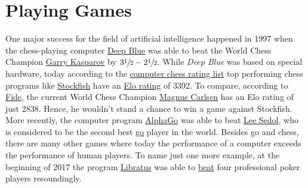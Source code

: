 \chapter{Playing Games}
One major success for the field of artificial intelligence happened in 1997 when the chess-playing computer
\href{https://en.wikipedia.org/wiki/Deep_Blue_(chess_computer)}{Deep Blue} was able to beat the World Chess
Champion \href{https://en.wikipedia.org/wiki/Garry_Kasparov}{Garry Kasparov} by $3\sfrac{1}{2}-2\sfrac{1}{2}$.
While \emph{\color{blue}Deep Blue} was based on special hardware, today according to the
\href{http://www.computerchess.org.uk/ccrl/4040/rating_list_all.html}{computer chess rating list} 
top performing chess programs like \href{https://en.wikipedia.org/wiki/Stockfish_(chess)}{Stockfish} have an 
\href{https://en.wikipedia.org/wiki/Elo_rating_system}{Elo rating} of 3392.  To compare, according to 
\href{https://ratings.fide.com/top.phtml?list=men}{Fide}, the current 
World Chess Champion \href{https://en.wikipedia.org/wiki/Magnus_Carlsen}{Magnus Carlsen} has an Elo rating of
just 2838.  Hence, he wouldn't stand a chance to win a game against Stockfish.  More recently, the computer program
\href{https://en.wikipedia.org/wiki/AlphaGo}{AlphaGo} was able to beat
\href{https://en.wikipedia.org/wiki/Lee_Sedol}{Lee Sedol}, who is considered to be the second best 
\href{https://en.wikipedia.org/wiki/Go_(game)}{go} player in the world.  Besides go and chess, there are many
other games where today the performance of a computer exceeds the performance of human players.  To name just
one more example, at the beginning of 2017 the program \href{https://en.wikipedia.org/wiki/Libratus}{Libratus} was able to 
\href{https://www.engadget.com/2017/01/31/libratus-the-poker-playing-ai-destroyed-its-four-human-rivals/}{beat}
four professional poker players resoundingly.

